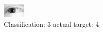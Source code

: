 \begin{figure}[h!]
\begin{center}
\includegraphics[width=0.60\columnwidth]{figures/ID2417_class_3_target_4.png}
\end{center}
\caption{ Classification: 3 actual target: 4}
\label{fig:ID2417_class_3_target_4}
\end{figure}
